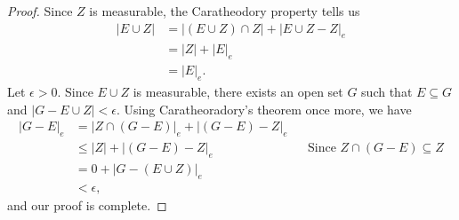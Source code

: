 \documentclass[10pt,a4paper]{article}
\theoremstyle{theorem}
\theoremstyle{definition}
\begin{document}
\begin{proof}
Since $Z$ is measurable, the Caratheodory property tells us
\begin{align*}
|E \cup Z| &= |(E \cup Z) \cap Z| + |E \cup Z - Z|_e\\
&= |Z| + |E|_e\\
&= |E|_e.
\end{align*}
Let $\epsilon > 0$. Since $E \cup Z$ is measurable, there exists an open set $G$ such that $E \subseteq G$ and $|G - E \cup Z| < \epsilon$.  Using Caratheoradory's theorem once more, we have
\begin{align*}
|G - E|_e &= |Z \cap (G - E)|_e + |(G - E) - Z|_e\\
&\leq |Z| + |(G - E) - Z|_e &&\text{Since } Z \cap (G - E) \subseteq Z\\
&= 0 + |G - (E \cup Z)|_e\\
&< \epsilon,
\end{align*}
and our proof is complete.
\end{proof}
\end{document}
